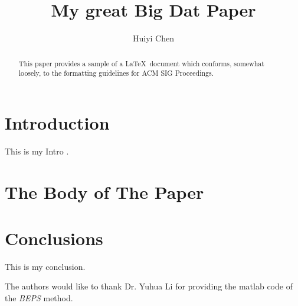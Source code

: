 \documentclass[sigconf]{acmart}
\begin{document}
\title{My great Big Dat Paper}


\author{Huiyi Chen}



\renewcommand{\shortauthors}{B. Trovato et al.}


\begin{abstract}
This paper provides a sample of a \LaTeX\ document which conforms,
somewhat loosely, to the formatting guidelines for
ACM SIG Proceedings.
\end{abstract}



\maketitle

\section{Introduction}

This is my Intro \cite{Editor00}.



\section{The Body of The Paper}


\section{Conclusions}

This is my conclusion.



\begin{acks}

  The authors would like to thank Dr. Yuhua Li for providing the
  matlab code of the \textit{BEPS} method.

 
\end{acks}


 
\end{document}
